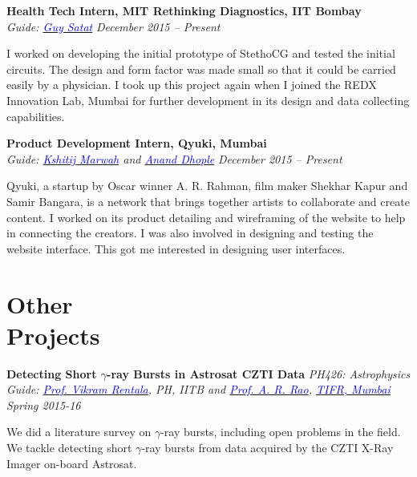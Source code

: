 \documentclass[margin,line]{res}
\newenvironment{list1}{
  \begin{list}{\ding{113}}{%
      \setlength{\itemsep}{0in}
      \setlength{\parsep}{0in} \setlength{\parskip}{0in}
      \setlength{\topsep}{0in} \setlength{\partopsep}{0in} 
      \setlength{\leftmargin}{0.17in}}}{\end{list}}
\begin{document}
\begin{resume}
{\bf Health Tech Intern, MIT Rethinking Diagnostics, IIT Bombay} \\
{\em Guide: \href{http://web.media.mit.edu/~guysatat/}{\textcolor{blue}{Guy Satat}}} \hfill {\it December 2015 -- Present} \\
\vspace*{-.13in}
\begin{list1}
\item[]
I worked on developing the initial prototype of StethoCG and tested the initial circuits. The design and form factor was made small so that it could be carried easily by a physician. I took up this project again when I joined the REDX Innovation Lab, Mumbai for further development in its design and data collecting capabilities.
\end{list1}

{\bf Product Development Intern, Qyuki, Mumbai} \\
{\em Guide: \href{http://www.kshitijmarwah.com}{\textcolor{blue}{Kshitij Marwah}} and \href{https://www.linkedin.com/in/ananddhople}{\textcolor{blue}{Anand Dhople}}} \hfill {\it December 2015 -- Present} \\
\vspace*{-.13in}
\begin{list1}
\item[]
Qyuki, a startup by Oscar winner A. R. Rahman, film maker Shekhar Kapur and Samir Bangara, is a network that brings together artists to collaborate and create content. I worked on its product detailing and wireframing of the website to help in connecting the creators. I was also involved in designing and testing the website interface. This got me interested in designing user interfaces. 
\end{list1}

\section{\sc Other \\Projects}
{\bf Detecting Short $\gamma$-ray Bursts in Astrosat CZTI Data} \hfill \textit{PH426: Astrophysics} \\
{\em Guide: \href{https://sites.google.com/site/vikramrentalahome/}{\textcolor{blue}{Prof. Vikram Rentala}}, \textit{PH, IITB} and \href{http://web.tifr.res.in/~arrao/}{\textcolor{blue}{Prof. A. R. Rao}}, \href{http://www.tifr.res.in/}{\textcolor{blue} {TIFR, Mumbai}} \hfill Spring 2015-16} \\
\vspace*{-.15in}
\begin{list1}
\item[] We did a literature survey on $\gamma$-ray bursts, including open problems in the field. We tackle detecting short $\gamma$-ray bursts from data acquired by the CZTI X-Ray Imager on-board Astrosat.
\end{list1}


\end{resume}
\end{document}
